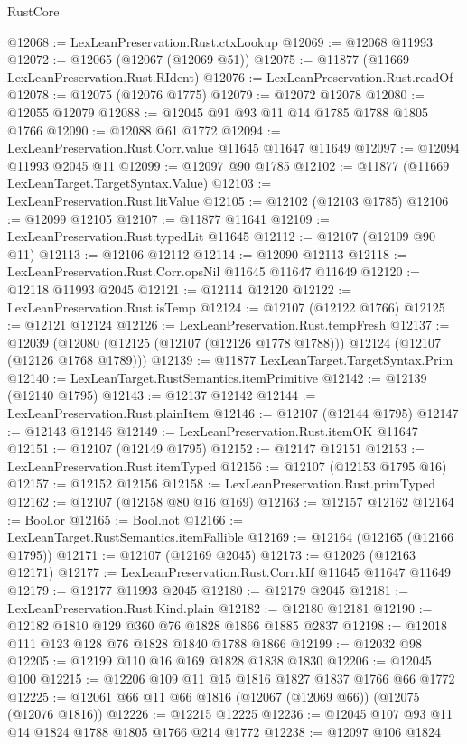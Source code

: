 \begin{lexlean}{RustCore}
\begin{coremodule}
@12068 := LexLeanPreservation.Rust.ctxLookup
@12069 := @12068 @11993
@12072 := @12065 (@12067 (@12069 @51))
@12075 := @11877 (@11669 LexLeanPreservation.Rust.RIdent)
@12076 := LexLeanPreservation.Rust.readOf
@12078 := @12075 (@12076 @1775)
@12079 := @12072 @12078
@12080 := @12055 @12079
@12088 := @12045 @91 @93 @11 @14 @1785 @1788 @1805 @1766
@12090 := @12088 @61 @1772
@12094 := LexLeanPreservation.Rust.Corr.value @11645 @11647 @11649
@12097 := @12094 @11993 @2045 @11
@12099 := @12097 @90 @1785
@12102 := @11877 (@11669 LexLeanTarget.TargetSyntax.Value)
@12103 := LexLeanPreservation.Rust.litValue
@12105 := @12102 (@12103 @1785)
@12106 := @12099 @12105
@12107 := @11877 @11641
@12109 := LexLeanPreservation.Rust.typedLit @11645
@12112 := @12107 (@12109 @90 @11)
@12113 := @12106 @12112
@12114 := @12090 @12113
@12118 := LexLeanPreservation.Rust.Corr.opsNil @11645 @11647 @11649
@12120 := @12118 @11993 @2045
@12121 := @12114 @12120
@12122 := LexLeanPreservation.Rust.isTemp
@12124 := @12107 (@12122 @1766)
@12125 := @12121 @12124
@12126 := LexLeanPreservation.Rust.tempFresh
@12137 := @12039
    (@12080 (@12125 (@12107 (@12126 @1778 @1788))) @12124 (@12107 (@12126 @1768 @1789)))
@12139 := @11877 LexLeanTarget.TargetSyntax.Prim
@12140 := LexLeanTarget.RustSemantics.itemPrimitive
@12142 := @12139 (@12140 @1795)
@12143 := @12137 @12142
@12144 := LexLeanPreservation.Rust.plainItem
@12146 := @12107 (@12144 @1795)
@12147 := @12143 @12146
@12149 := LexLeanPreservation.Rust.itemOK @11647
@12151 := @12107 (@12149 @1795)
@12152 := @12147 @12151
@12153 := LexLeanPreservation.Rust.itemTyped
@12156 := @12107 (@12153 @1795 @16)
@12157 := @12152 @12156
@12158 := LexLeanPreservation.Rust.primTyped
@12162 := @12107 (@12158 @80 @16 @169)
@12163 := @12157 @12162
@12164 := Bool.or
@12165 := Bool.not
@12166 := LexLeanTarget.RustSemantics.itemFallible
@12169 := @12164 (@12165 (@12166 @1795))
@12171 := @12107 (@12169 @2045)
@12173 := @12026 (@12163 @12171)
@12177 := LexLeanPreservation.Rust.Corr.kIf @11645 @11647 @11649
@12179 := @12177 @11993 @2045
@12180 := @12179 @2045
@12181 := LexLeanPreservation.Rust.Kind.plain
@12182 := @12180 @12181
@12190 := @12182 @1810 @129 @360 @76 @1828 @1866 @1885 @2837
@12198 := @12018 @111 @123 @128 @76 @1828 @1840 @1788 @1866
@12199 := @12032 @98
@12205 := @12199 @110 @16 @169 @1828 @1838 @1830
@12206 := @12045 @100
@12215 := @12206 @109 @11 @15 @1816 @1827 @1837 @1766 @66 @1772
@12225 := @12061 @66 @11 @66 @1816 (@12067 (@12069 @66)) (@12075 (@12076 @1816))
@12226 := @12215 @12225
@12236 := @12045 @107 @93 @11 @14 @1824 @1788 @1805 @1766 @214 @1772
@12238 := @12097 @106 @1824

\end{coremodule}
\end{lexlean}
